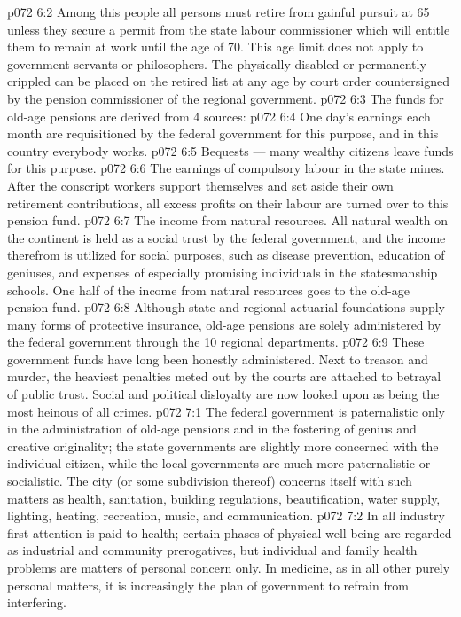 \vs p072 6:2 Among this people all persons must retire from gainful pursuit at 65 unless they secure a permit from the state labour commissioner which will entitle them to remain at work until the age of 70. This age limit does not apply to government servants or philosophers. The physically disabled or permanently crippled can be placed on the retired list at any age by court order countersigned by the pension commissioner of the regional government.
\vs p072 6:3 \pc The funds for old\hyp{}age pensions are derived from 4 sources:
\vs p072 6:4 \bibnobreakspace One day’s earnings each month are requisitioned by the federal government for this purpose, and in this country everybody works.
\vs p072 6:5 \bibnobreakspace Bequests --- many wealthy citizens leave funds for this purpose.
\vs p072 6:6 \bibnobreakspace The earnings of compulsory labour in the state mines. After the conscript workers support themselves and set aside their own retirement contributions, all excess profits on their labour are turned over to this pension fund.
\vs p072 6:7 \bibnobreakspace The income from natural resources. All natural wealth on the continent is held as a social trust by the federal government, and the income therefrom is utilized for social purposes, such as disease prevention, education of geniuses, and expenses of especially promising individuals in the statesmanship schools. One half of the income from natural resources goes to the old\hyp{}age pension fund.
\vs p072 6:8 \pc Although state and regional actuarial foundations supply many forms of protective insurance, old\hyp{}age pensions are solely administered by the federal government through the 10 regional departments.
\vs p072 6:9 These government funds have long been honestly administered. Next to treason and murder, the heaviest penalties meted out by the courts are attached to betrayal of public trust. Social and political disloyalty are now looked upon as being the most heinous of all crimes.
\vs p072 7:1 The federal government is paternalistic only in the administration of old\hyp{}age pensions and in the fostering of genius and creative originality; the state governments are slightly more concerned with the individual citizen, while the local governments are much more paternalistic or socialistic. The city (or some subdivision thereof) concerns itself with such matters as health, sanitation, building regulations, beautification, water supply, lighting, heating, recreation, music, and communication.
\vs p072 7:2 In all industry first attention is paid to health; certain phases of physical well\hyp{}being are regarded as industrial and community prerogatives, but individual and family health problems are matters of personal concern only. In medicine, as in all other purely personal matters, it is increasingly the plan of government to refrain from interfering.
